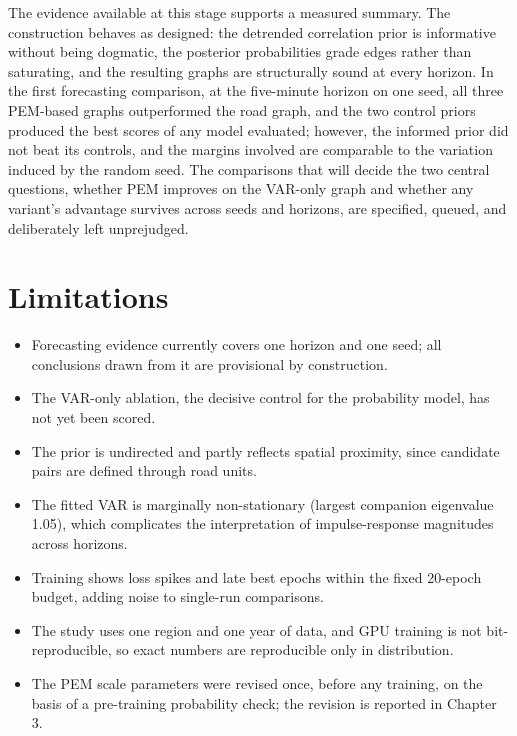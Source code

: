 \documentclass[MTech]{ugthesis}
\begin{document}
The evidence available at this stage supports a measured summary. The construction behaves as designed: the detrended correlation prior is informative without being dogmatic, the posterior probabilities grade edges rather than saturating, and the resulting graphs are structurally sound at every horizon. In the first forecasting comparison, at the five-minute horizon on one seed, all three PEM-based graphs outperformed the road graph, and the two control priors produced the best scores of any model evaluated; however, the informed prior did not beat its controls, and the margins involved are comparable to the variation induced by the random seed. The comparisons that will decide the two central questions, whether PEM improves on the VAR-only graph and whether any variant's advantage survives across seeds and horizons, are specified, queued, and deliberately left unprejudged.

\section{Limitations}
\begin{itemize}
\item Forecasting evidence currently covers one horizon and one seed; all conclusions drawn from it are provisional by construction.
\item The VAR-only ablation, the decisive control for the probability model, has not yet been scored.
\item The prior is undirected and partly reflects spatial proximity, since candidate pairs are defined through road units.
\item The fitted VAR is marginally non-stationary (largest companion eigenvalue 1.05), which complicates the interpretation of impulse-response magnitudes across horizons.
\item Training shows loss spikes and late best epochs within the fixed 20-epoch budget, adding noise to single-run comparisons.
\item The study uses one region and one year of data, and GPU training is not bit-reproducible, so exact numbers are reproducible only in distribution.
\item The PEM scale parameters were revised once, before any training, on the basis of a pre-training probability check; the revision is reported in Chapter 3.
\end{itemize}
\end{document}

